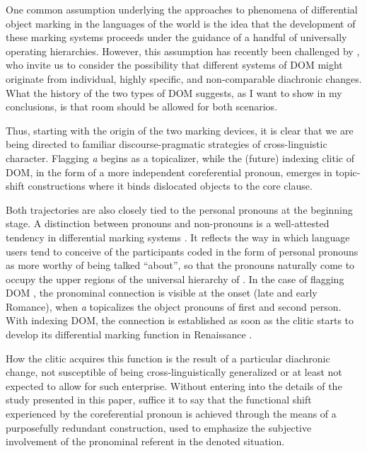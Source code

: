 \documentclass[output=paper]{LSP/langsci}
\begin{document}
 One common assumption underlying the approaches to phenomena of differential object marking in the languages of the world is the idea that the development of these marking systems proceeds under the guidance of a handful of universally operating hierarchies. However, this assumption has recently been challenged by \citet{Bickeletal2008Referential}, who invite us to consider the possibility that different systems of DOM might originate from individual, highly specific, and non-comparable diachronic changes. What the history of the two types of  DOM suggests, as I want to show in my conclusions, is that room should be allowed for both scenarios.

 Thus, starting with the origin of the two marking devices, it is clear that we are being directed to familiar discourse-pragmatic strategies of cross-linguistic character. Flagging \textit{a} begins as a topicalizer, while the (future) indexing clitic of DOM, in the form of a more independent coreferential pronoun, emerges in topic-shift constructions where it binds dislocated objects to the core clause. 

 Both trajectories are also closely tied to the personal pronouns at the beginning stage. A distinction between pronouns and non-pronouns is a well-attested tendency in differential marking systems \citep[195]{Comrie1989Language}. It reflects the way in which language users tend to conceive of the participants coded in the form of personal pronouns as more worthy of being talked “about”, so that the pronouns naturally come to occupy the upper regions of the universal hierarchy of . In the case of flagging DOM \citep{Pensado1995Creacion}, the pronominal connection is visible at the onset (late  and early Romance), when \textit{a} topicalizes the object pronouns of first and second person. With indexing DOM, the connection is established as soon as the clitic starts to develop its differential marking function in Renaissance . 

 How the clitic acquires this function is the result of a particular diachronic change, not susceptible of being cross-linguistically generalized or at least not expected to allow for such enterprise. Without entering into the details of the study presented in this paper, suffice it to say that the functional shift experienced by the coreferential pronoun is achieved through the means of a purposefully redundant construction, used to emphasize the subjective involvement of the pronominal referent in the denoted situation.
\end{document}
